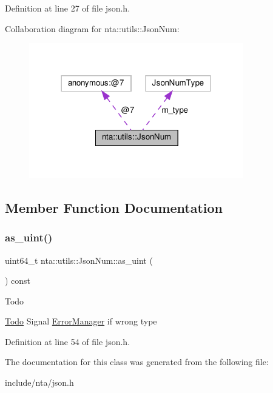 Definition at line 27 of file json.\+h.



Collaboration diagram for nta\+:\+:utils\+:\+:Json\+Num\+:\nopagebreak
\begin{figure}[H]
\begin{center}
\leavevmode
\includegraphics[width=264pt]{d6/d43/classnta_1_1utils_1_1JsonNum__coll__graph}
\end{center}
\end{figure}


\subsection{Member Function Documentation}
\mbox{\label{classnta_1_1utils_1_1JsonNum_a89e8033a247c3342d99a762f6110d877}} 
\subsubsection{\texorpdfstring{as\+\_\+uint()}{as\_uint()}}
{\footnotesize\ttfamily uint64\+\_\+t nta\+::utils\+::\+Json\+Num\+::as\+\_\+uint (\begin{DoxyParamCaption}{ }\end{DoxyParamCaption}) const\hspace{0.3cm}{\ttfamily [inline]}}

\begin{DoxyRefDesc}{Todo}
\item[\hyperlink{todo__todo000007}{Todo}]Signal \hyperlink{classnta_1_1ErrorManager}{Error\+Manager} if wrong type \end{DoxyRefDesc}


Definition at line 54 of file json.\+h.



The documentation for this class was generated from the following file\+:\begin{DoxyCompactItemize}
\item 
include/nta/json.\+h\end{DoxyCompactItemize}
